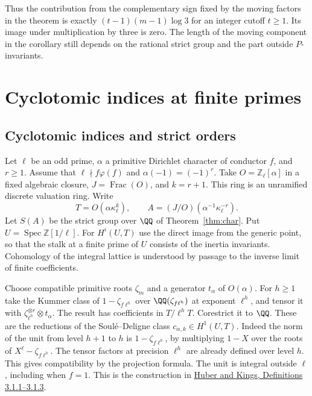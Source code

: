 \documentclass[a4paper,11pt]{article}
\theoremstyle{definition}
\theoremstyle{remark}
\newcommand{\ZZ}{\mathbb Z}\newcommand{\ord}{\operatorname{ord}}
\numberwithin{equation}{section}
\begin{document}
Thus the contribution from the complementary sign fixed by
the moving factors in the theorem is exactly
\((t-1)(m-1)\log3\) for an integer cutoff \(t\ge1\). Its image
under multiplication by three is zero. The length of the
moving component in the corollary still depends on the rational
strict group and the part outside \(P\)-invariants.

\section{Cyclotomic indices at finite primes}\label{nav:g-III-3}

\subsection{Cyclotomic indices and strict orders}\label{nav:III-46}
Let \(\ell\) be an odd prime, \(\alpha\) a primitive Dirichlet
character of conductor \(f\), and \(r\ge1\). Assume that
\(\ell\nmid f\varphi(f)\) and \(\alpha(-1)=(-1)^r\).
Take \(O=\ZZ_\ell[\alpha]\) in a fixed algebraic closure,
\(J=\operatorname{Frac}(O)\), and \(k=r+1\).
This ring is an unramified discrete valuation ring. Write
\[
 T=O(\alpha\kappa_\ell^k),\qquad
 A=(J/O)(\alpha^{-1}\kappa_\ell^{-r}).
\]
Let \(S(A)\) be the strict group over \(\QQ\) of
Theorem~\ref{thm:char}. Put \(U=\operatorname{Spec}\ZZ[1/\ell]\).
For \(H^i(U,T)\) use the direct image from the generic point,
so that the stalk at a finite prime of \(U\) consists of the
inertia invariants. Cohomology of the integral lattice is
understood by passage to the inverse limit of finite coefficients.

Choose compatible primitive roots \(\zeta_m\) and a generator
\(t_\alpha\) of \(O(\alpha)\). For \(h\ge1\) take the Kummer
class of \(1-\zeta_{f\ell^h}\) over \(\QQ(\zeta_{f\ell^h})\)
at exponent \(\ell^h\), and tensor it with
\(\zeta_{\ell^h}^{\otimes r}\otimes t_\alpha\). The result has
coefficients in \(T/\ell^hT\). Corestrict it to \(\QQ\).
These are the reductions of the Soul\'e--Deligne class
\(c_{\alpha,k}\in H^1(U,T)\). Indeed the norm of the unit from
level \(h+1\) to \(h\) is \(1-\zeta_{f\ell^h}\), by multiplying
\(1-X\) over the roots of \(X^\ell-\zeta_{f\ell^h}\).
The tensor factors at precision \(\ell^h\) are already defined
over level \(h\). This gives compatibility by the projection
formula. The unit is integral outside \(\ell\), including
when \(f=1\). This is the construction in
\href{https://arxiv.org/pdf/math/0101071\#page=22}{Huber and
Kings, Definitions 3.1.1--3.1.3}.
\end{document}
